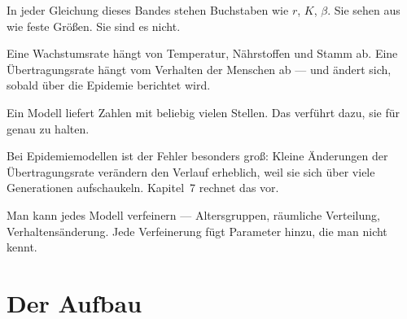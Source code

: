 \begin{warnung}
In jeder Gleichung dieses Bandes stehen Buchstaben wie $r$, $K$, $\beta$. Sie sehen aus wie feste Größen. Sie sind es nicht.

\begin{center}
\begin{minipage}{0.9\textwidth}
Eine Wachstumsrate hängt von Temperatur, Nährstoffen und Stamm ab. Eine Übertragungsrate hängt vom Verhalten der Menschen ab --- und ändert sich, sobald über die Epidemie berichtet wird.
\end{minipage}
\end{center}

\end{warnung}

\begin{warnung}
Ein Modell liefert Zahlen mit beliebig vielen Stellen. Das verführt dazu, sie für genau zu halten.

Bei Epidemiemodellen ist der Fehler besonders groß: Kleine Änderungen der Übertragungsrate verändern den Verlauf erheblich, weil sie sich über viele Generationen aufschaukeln. Kapitel~7 rechnet das vor.
\end{warnung}

\begin{warnung}
Man kann jedes Modell verfeinern --- Altersgruppen, räumliche Verteilung, Verhaltensänderung. Jede Verfeinerung fügt Parameter hinzu, die man nicht kennt.

\begin{center}
\begin{minipage}{0.88\textwidth}
\end{minipage}
\end{center}
\end{warnung}

\section*{Der Aufbau}

